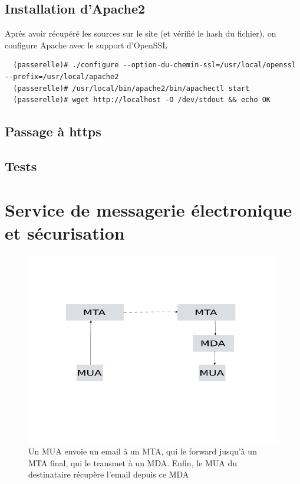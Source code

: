 \documentclass[a4paper]{article}
\begin{document}
\subsection{Installation d'Apache2}
Après avoir récupéré les sources sur le site (et vérifié le hash du fichier), on configure
Apache avec le support d'OpenSSL
\begin{verbatim}
  (passerelle)# ./configure --option-du-chemin-ssl=/usr/local/openssl --prefix=/usr/local/apache2
  (passerelle)# /usr/local/bin/apache2/bin/apachectl start
  (passerelle)# wget http://localhost -O /dev/stdout && echo OK
\end{verbatim}

\subsection{Passage à https}

\subsection{Tests}

\section{Service de messagerie électronique et sécurisation}
\begin{figure}[!ht]
	\centering
	\includegraphics[scale=.5]{emailrouting.png}
	\caption{\label{emailrouting} Un MUA envoie un email à un MTA, qui
		le forward jusqu'à un MTA final, qui le transmet à un MDA.
		Enfin, le MUA du destinataire récupère l'email depuis ce MDA}
\end{figure}
\end{document}
